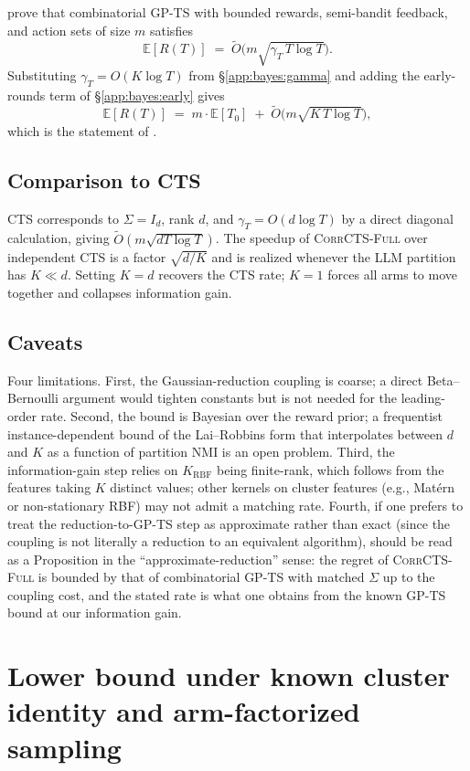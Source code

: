 \documentclass{article}
\theoremstyle{plain}
\theoremstyle{definition}
\theoremstyle{remark}
\newcommand{\E}{\mathbb{E}}
\newcommand{\CorrFull}{\textsc{CorrCTS-Full}}
\begin{document}
\citet{sandberg2025bayesian} prove that combinatorial GP-TS with bounded rewards, semi-bandit feedback, and action sets of size $m$ satisfies
\[
\E[R(T)] \;=\; \tilde O\!\bigl(m \sqrt{\gamma_T \, T \log T}\bigr).
\]
Substituting $\gamma_T = O(K \log T)$ from \S\ref{app:bayes:gamma} and adding the early-rounds term of \S\ref{app:bayes:early} gives
\[
\E[R(T)] \;=\; m \cdot \E[T_0] \;+\; \tilde O\!\bigl(m \sqrt{K \, T \log T}\bigr),
\]
which is the statement of .

\subsection{Comparison to CTS}\label{app:bayes:ctsgap}

CTS corresponds to $\Sigma = I_d$, rank $d$, and $\gamma_T = O(d \log T)$ by a direct diagonal calculation, giving $\tilde O(m \sqrt{d T \log T})$.
The speedup of \CorrFull{} over independent CTS is a factor $\sqrt{d/K}$ and is realized whenever the LLM partition has $K \ll d$.
Setting $K = d$ recovers the CTS rate; $K = 1$ forces all arms to move together and collapses information gain.

\subsection{Caveats}\label{app:bayes:caveats}

Four limitations. First, the Gaussian-reduction coupling is coarse; a direct Beta--Bernoulli argument would tighten constants but is not needed for the leading-order rate. Second, the bound is Bayesian over the reward prior; a frequentist instance-dependent bound of the Lai--Robbins form that interpolates between $d$ and $K$ as a function of partition NMI is an open problem. Third, the information-gain step relies on $K_{\mathrm{RBF}}$ being finite-rank, which follows from the features taking $K$ distinct values; other kernels on cluster features (e.g., Matérn or non-stationary RBF) may not admit a matching rate. Fourth, if one prefers to treat the reduction-to-GP-TS step as approximate rather than exact (since the coupling is not literally a reduction to an equivalent algorithm),  should be read as a Proposition in the ``approximate-reduction'' sense: the regret of \CorrFull{} is bounded by that of combinatorial GP-TS with matched $\Sigma$ up to the coupling cost, and the stated rate is what one obtains from the known GP-TS bound at our information gain.

\section{Lower bound under known cluster identity and arm-factorized sampling}\label{app:lowerbound}
\end{document}
